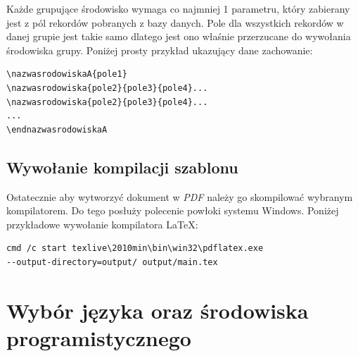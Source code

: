 \vspace{5mm}
Każde grupujące środowisko wymaga co najmniej 1 parametru, który zabierany jest z pól rekordów pobranych z bazy danych. Pole dla wszystkich rekordów w danej grupie jest takie samo dlatego jest ono właśnie przerzucane do wywołania środowiska grupy.
Poniżej prosty przykład ukazujący dane zachowanie:
\begin{lstlisting}
\nazwasrodowiskaA{pole1}
\nazwasrodowiska{pole2}{pole3}{pole4}...
\nazwasrodowiska{pole2}{pole3}{pole4}...
...
\endnazwasrodowiskaA
\end{lstlisting}

\subsection{Wywołanie kompilacji szablonu}

Ostatecznie aby wytworzyć dokument w \emph{PDF} należy go skompilować wybranym kompilatorem. Do tego posłuży polecenie powłoki systemu Windows. Poniżej przykładowe wywołanie kompilatora LaTeX:
\begin{lstlisting}
cmd /c start texlive\2010min\bin\win32\pdflatex.exe 
--output-directory=output/ output/main.tex
\end{lstlisting}


\section{Wybór języka oraz środowiska programistycznego }

